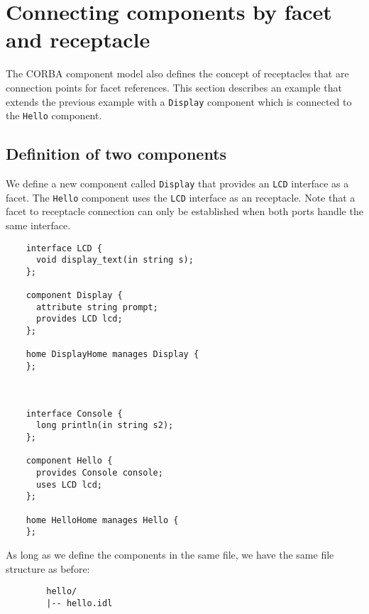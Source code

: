 \section{Connecting components by facet and receptacle}

The CORBA component model also defines the concept of receptacles that are
connection points for facet references.
This section describes an example that extends the previous example with
a {\tt Display} component which is connected to the {\tt Hello} component.


\subsection{Definition of two components}

We define a new component called {\tt Display} that provides an {\tt LCD}
interface as a facet.
The {\tt Hello} component uses the {\tt LCD} interface as an receptacle.
Note that a facet to receptacle connection can only be established when
both ports handle the same interface.

\begin{verbatim}
    interface LCD {
      void display_text(in string s);
    };

    component Display {
      attribute string prompt;
      provides LCD lcd;
    };

    home DisplayHome manages Display {
    };



    interface Console {
      long println(in string s2);
    };

    component Hello {
      provides Console console;
      uses LCD lcd;
    };

    home HelloHome manages Hello {
    };
\end{verbatim}

\noindent
As long as we define the components in the same file, we have the same file structure
as before:  
\begin{verbatim}
        hello/
        |-- hello.idl
\end{verbatim}

